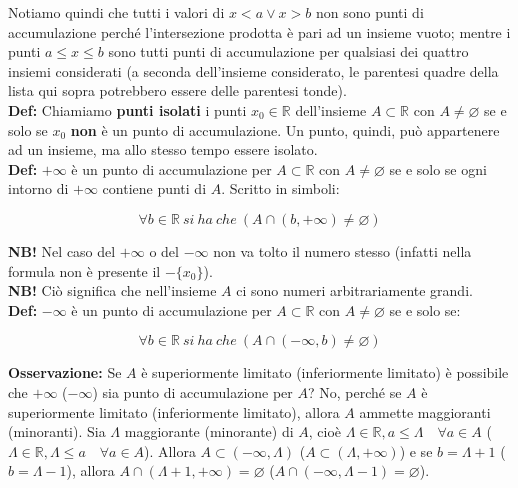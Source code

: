 \documentclass{article}
\begin{document}
\noindent Notiamo quindi che tutti i valori di $x < a \vee x > b$ non sono punti di accumulazione perché l'intersezione prodotta è pari ad un insieme vuoto; mentre i punti $a \leq x \leq b$ sono tutti punti di accumulazione per qualsiasi dei quattro insiemi considerati (a seconda dell'insieme considerato, le parentesi quadre della lista qui sopra potrebbero essere delle parentesi tonde).\\

\noindent\textbf{Def:} Chiamiamo \textbf{punti isolati} i punti $x_0 \in \mathbb{R}$ dell'insieme $A \subset \mathbb{R}$ con $A \neq \varnothing$ se e solo se $x_0$ \textbf{non} è un punto di accumulazione. Un punto, quindi, può appartenere ad un insieme, ma allo stesso tempo essere isolato. \\

\noindent\textbf{Def:} $+ \infty$ è un punto di accumulazione per $A \subset \mathbb{R}$ con $A \neq \varnothing$ se e solo se ogni intorno di $+ \infty$ contiene punti di $A$. Scritto in simboli:

\begin{equation*}
    \forall b \in \mathbb{R} \ si \ ha \ che \ (A \cap (b, + \infty) \neq \varnothing)
\end{equation*}

\noindent\textbf{NB!} Nel caso del $+\infty$ o del $-\infty$ non va tolto il numero stesso (infatti nella formula non è presente il $- \{x_0\}$).\\

\noindent\textbf{NB!} Ciò significa che nell'insieme $A$ ci sono numeri arbitrariamente grandi.\\

\noindent\textbf{Def:} $- \infty$ è un punto di accumulazione per $A \subset \mathbb{R}$ con $A \neq \varnothing$ se e solo se:

\begin{equation*}
    \forall b \in \mathbb{R} \ si \ ha \ che \ (A \cap (- \infty, b) \neq \varnothing)
\end{equation*}

\noindent\textbf{Osservazione:} Se $A$ è superiormente limitato (inferiormente limitato) è possibile che $+ \infty$ ($- \infty$) sia punto di accumulazione per $A$? No, perché se $A$ è superiormente limitato (inferiormente limitato), allora $A$ ammette maggioranti (minoranti). Sia $\Lambda$ maggiorante (minorante) di $A$, cioè $\Lambda \in \mathbb{R}, a \leq \Lambda \quad \forall a \in A$ ($\Lambda \in \mathbb{R}, \Lambda \leq a \quad \forall a \in A$). Allora $A \subset (- \infty, \Lambda)$ ($A \subset (\Lambda, + \infty)$) e se $b = \Lambda + 1$ ($b = \Lambda - 1$), allora $A \cap (\Lambda + 1, +\infty) = \varnothing$ ($A \cap (-\infty, \Lambda - 1) = \varnothing$).\\
\end{document}

